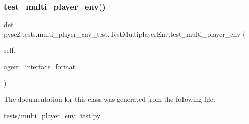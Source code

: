 \subsubsection{\texorpdfstring{test\+\_\+multi\+\_\+player\+\_\+env()}{test\_multi\_player\_env()}}
{\footnotesize\ttfamily def pysc2.\+tests.\+multi\+\_\+player\+\_\+env\+\_\+test.\+Test\+Multiplayer\+Env.\+test\+\_\+multi\+\_\+player\+\_\+env (\begin{DoxyParamCaption}\item[{}]{self,  }\item[{}]{agent\+\_\+interface\+\_\+format }\end{DoxyParamCaption})}



The documentation for this class was generated from the following file\+:\begin{DoxyCompactItemize}
\item 
tests/\mbox{\hyperlink{multi__player__env__test_8py}{multi\+\_\+player\+\_\+env\+\_\+test.\+py}}\end{DoxyCompactItemize}
